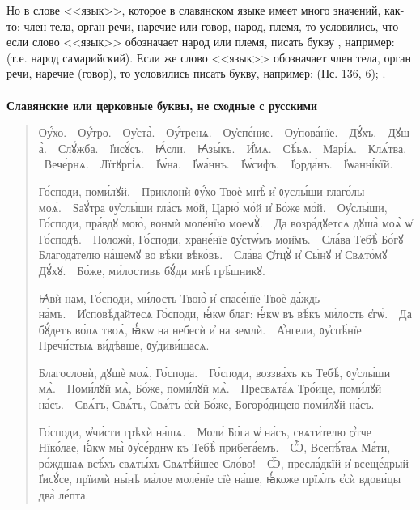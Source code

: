 \documentclass[11pt,a4paper,oneside]{memoir}
\newcommand{\exercise}{}
\newcommand{\exquote}{quote}
\newcommand{\sdash}{\textenglish{\textemdash}}
\begin{document}
    Но в слове <<язык>>, которое в славянском языке имеет много значений, как-то: член тела, орган речи, наречие или говор, народ, племя, то условились, что если слово <<язык>> обозначает народ или племя, писать букву {}, например: {} (т.е. народ самарийский). Если же слово <<язык>> обозначает член тела, орган речи, наречие (говор), то условились писать букву{}, например: {} (Пс. 136, 6); {}.
    
                    \paragraph{\exercise}

    \textbf{Славянские или церковные буквы, не сходные с русскими}
    
    \begin{\exquote}\begin{slv}
        Оу҆́хо.~\sdash~Оу҆́тро.~\sdash~Оу҆ста̀.~\sdash~Оу҆́тренѧ.~\sdash~Оу҆спе́ние.~\sdash~Оу҆пова́нїе.~\sdash~Дꙋ́хъ.~\sdash~Дꙋша̀.~\sdash~Слꙋ́жба.~\sdash~І҆исꙋ́съ.~\sdash~Ꙗ҆́сли.~\sdash~Ꙗ҆зы́къ.~\sdash~И҆́мѧ.~\sdash~Сѣ́ьѧ.~\sdash~Марі́ѧ.~\sdash~Клѧ́тва.~\sdash~Вече́рнѧ.~\sdash~Лїтꙋргі́ѧ.~\sdash~І҆ѡ́на.~\sdash~І҆ѡа́ннъ.~\sdash~І҆ѡ́сифъ.~\sdash~І҆ѻрда́нъ.~\sdash~І҆ѡанні́кїй.
        
        Го́споди, поми́лꙋй.~\sdash~Приклонѝ ᲂу҆́хо Твоѐ мнѣ̀ и҆ ᲂуслы́ши глаго́лы моѧ̀.~\sdash~Ѕаꙋ́тра ᲂу҆слы́ши гла́съ мо́й, Царю̀ мо́й и҆ Бо́же мо́й.~\sdash~Оу҆слы́ши, Го́споди, пра́вдꙋ мою̀, вонмѝ моле́нїю моемꙋ̀.~\sdash~Да возра́дꙋетсѧ дꙋша̀ моѧ̀ ѡ҆ Го́сподѣ.~\sdash~Положѝ, Го́споди, хране́нїе ᲂу҆стѡ́мъ мои̑мъ.~\sdash~Сла́ва Тебѣ̀ Бо́гꙋ Благода́телю на́шемꙋ во вѣ́ки вѣко́въ.~\sdash~Сла́ва Ѻ҆тцꙋ̀ и҆ Сы́нꙋ и҆ Свѧто́мꙋ Дꙋ́хꙋ.~\sdash~Бо́же, ми́лостивъ бꙋ́ди мнѣ̀ грѣ́шникꙋ.
        
        Ꙗ҆вѝ нам, Го́споди, ми́лость Твою̀ и҆ спасе́нїе Твоѐ да́ждь на́мъ.~\sdash~И҆сповѣ́дайтесѧ Го́споди, ꙗ҆́кѡ благ: ꙗ҆́кѡ въ вѣ́къ ми́лость є҆гѡ́.~\sdash~Да бꙋ́детъ во́лѧ твоѧ̀, ꙗ҆́кѡ на небесѝ и҆ на землѝ.~\sdash~А҆́нгели, ᲂу҆спѣ́нїе Пречи́стыѧ ви́дѣвше, ᲂу҆диви́шасѧ.
        
        Благословѝ, дꙋшѐ моѧ̀, Го́спода.~\sdash~Го́споди, воззва́хъ къ Тебѣ̀, ᲂу҆слы́ши мѧ̀.~\sdash~Поми́лꙋй мѧ̀, Бо́же, поми́лꙋй мѧ̀.~\sdash~Пресвѧта́ѧ Тро́ице, поми́лꙋй на́съ.~\sdash~Свѧ́тъ, Свѧ́тъ, Свѧ́тъ є҆сѝ Бо́же, Богоро́дицею поми́лꙋй на́съ.
        
        Го́споди, ѡ҆чи́сти грѣхѝ на́шѧ.~\sdash~Моли́ Бо́га ѡ҆ на́съ, свѧти́телю ѻ҆́тче Нїко́лае, ꙗ҆́кѡ мы̀ ᲂу҆се́рднѡ къ Тебѣ̀ прибега́емъ.~\sdash~Ѽ, Всепѣ́таѧ Ма́ти, ро́ждшаѧ всѣ́хъ свѧты́хъ Свѧтѣ́йшее Сло́во!~\sdash~Ѽ, пресла́дкїй и҆ всеще́дрый І҆исꙋ́се, прїимѝ ны́нѣ ма́лое моле́нїе сїѐ на́ше, ꙗ҆́коже прїѧ́лъ є҆сѝ вдови́цы два̀ ле́пта.
    \end{slv}\end{\exquote}
\end{document}

